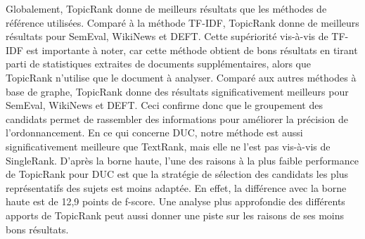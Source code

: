        Globalement, TopicRank donne de meilleurs résultats que les méthodes de
        référence utilisées.
        Comparé à la méthode TF-IDF, TopicRank donne de meilleurs résultats pour
        SemEval, WikiNews et DEFT. Cette supériorité vis-à-vis de TF-IDF est
        importante à noter, car cette méthode obtient de bons résultats en
        tirant parti de statistiques extraites de documents supplémentaires,
        alors que TopicRank n'utilise que le document à analyser. Comparé aux
        autres méthodes à base de graphe, TopicRank donne des résultats
        significativement meilleurs pour SemEval, WikiNews et DEFT. Ceci
        confirme donc que le groupement des candidats permet de rassembler des
        informations pour améliorer la précision de l'ordonnancement. En ce qui
        concerne DUC, notre méthode est aussi significativement meilleure que
        TextRank, mais elle ne l'est pas vis-à-vis de SingleRank. D'après la
        borne haute, l'une des raisons à la plus faible performance de TopicRank
        pour DUC est que la stratégie de sélection des candidats les plus
        représentatifs des sujets est moins adaptée. En effet, la différence
        avec la borne haute est de 12,9 points de f-score. Une analyse plus
        approfondie des différents apports de TopicRank peut aussi donner une
        piste sur les raisons de ses moins bons résultats.
